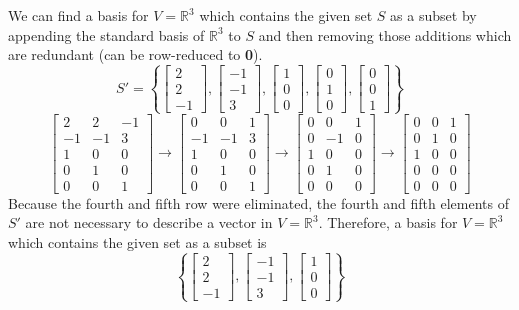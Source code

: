 \documentclass[]{article}
\newcommand{\reals}{\mathbb{R}}
\newcommand{\bmat}[1]{\begin{bmatrix}#1\end{bmatrix}}
\begin{document}
\section{}
We can find a basis for $V = \reals^3$ which contains the given set $S$ as a subset by appending the standard basis of $\reals^3$ to $S$ and then removing those additions which are redundant (can be row-reduced to \textbf{0}).
\[S' = \left\{\bmat{2\\2\\-1}, \bmat{-1\\-1\\3}, \bmat{1\\0\\0}, \bmat{0\\1\\0}, \bmat{0\\0\\1}\right\}\]
\[ \bmat{2&2&-1\\-1&-1&3\\1&0&0\\0&1&0\\0&0&1} \rightarrow \bmat{0&0&1\\-1&-1&3\\1&0&0\\0&1&0\\0&0&1} \rightarrow \bmat{0&0&1\\0&-1&0\\1&0&0\\0&1&0\\0&0&0} \rightarrow \bmat{0&0&1\\0&1&0\\1&0&0\\0&0&0\\0&0&0}\]
Because the fourth and fifth row were eliminated, the fourth and fifth elements of $S'$ are not necessary to describe a vector in $V = \reals^3$. Therefore, a basis for $V = \reals^3$ which contains the given set as a subset is
\[ \left\{ \bmat{2\\2\\-1}, \bmat{-1\\-1\\3}, \bmat{1\\0\\0} \right\} \]
\end{document}
